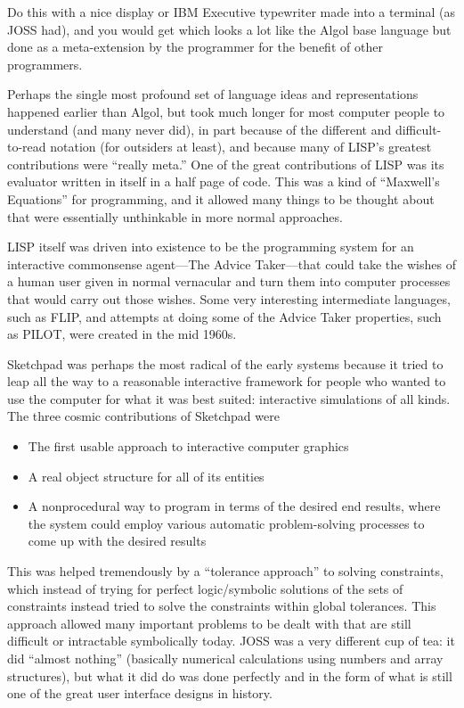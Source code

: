 \documentclass[a4paper,10pt,twoside]{book}
\begin{document}
Do this with a nice display or IBM Executive typewriter made into a terminal (as JOSS had), and you would get 
which looks a lot like the Algol base language but done as a meta-extension by the programmer for the benefit of other programmers.



Perhaps the single most profound set of language ideas and representations happened earlier than Algol, but took much longer for most computer people to understand (and many never did), in part because of the different and difficult-to-read notation (for outsiders at 
least), and because many of LISP’s greatest contributions were “really meta.” One of the great contributions of LISP was its evaluator written in itself in a half page of code. This was a kind 
of “Maxwell’s Equations” for programming, and it allowed many things to be thought about that were essentially unthinkable in more normal approaches. 

LISP itself was driven into existence to be the programming system for an interactive commonsense agent—The Advice Taker—that could take the wishes of a human user given in normal vernacular and turn them into computer processes that would carry out those wishes. 
Some very interesting intermediate languages, such as FLIP, and attempts at doing some of the Advice Taker properties, such as PILOT, were created in the mid 1960s. 

Sketchpad was perhaps the most radical of the early systems because it tried to leap all the way to a reasonable interactive framework for people who wanted to use the computer for what it was best suited: interactive simulations of all kinds. The three cosmic contributions of 
Sketchpad were 
\begin{itemize}
\item  The first usable approach to interactive computer graphics 
\item A real object structure for all of its entities 
\item  A nonprocedural way to program in terms of the desired end results, where the system 
could employ various automatic problem-solving processes to come up with the 
desired results 
\end{itemize}

This was helped tremendously by a “tolerance approach” to solving constraints, which instead of trying for perfect logic/symbolic solutions of the sets of constraints instead tried to solve 
the constraints within global tolerances. This approach allowed many important problems to 
be dealt with that are still difficult or intractable symbolically today. 
JOSS was a very different cup of tea: it did “almost nothing” (basically numerical calculations using numbers and array structures), but what it did do was done perfectly and in the form of what is still one of the great user interface designs in history. 
\end{document}
